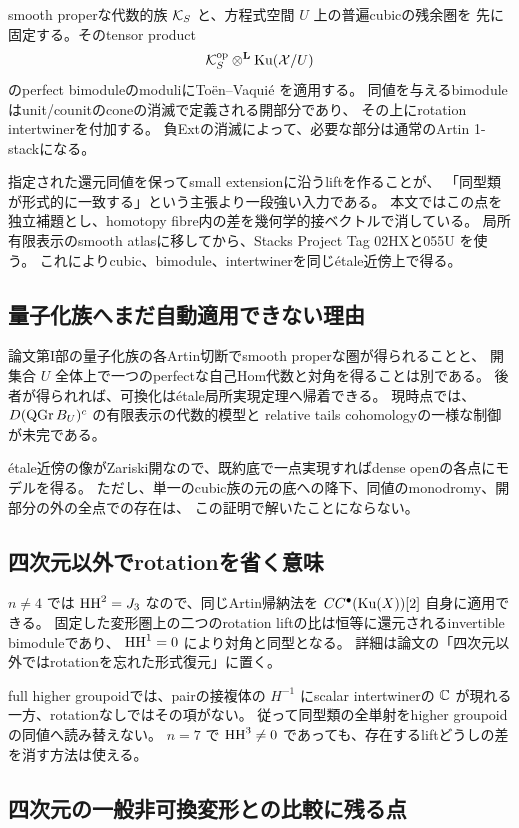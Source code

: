 smooth properな代数的族 \(\mathcal K_S\) と、方程式空間 \(U\) 上の普遍cubicの残余圏を
先に固定する。そのtensor product
\[
 \mathcal K_S^{\mathrm{op}}\mathbin{\otimes^{\mathbf L}}\operatorname{Ku}(\mathcal X/U)
\]
のperfect bimoduleのmoduliにToën--Vaquié \cite{TV} を適用する。
同値を与えるbimoduleはunit/counitのconeの消滅で定義される開部分であり、
その上にrotation intertwinerを付加する。
負Extの消滅によって、必要な部分は通常のArtin 1-stackになる。

指定された還元同値を保ってsmall extensionに沿うliftを作ることが、
「同型類が形式的に一致する」という主張より一段強い入力である。
本文ではこの点を独立補題とし、homotopy fibre内の差を幾何学的接ベクトルで消している。
局所有限表示のsmooth atlasに移してから、Stacks Project Tag 02HXと055U \cite{Stacks}を使う。
これによりcubic、bimodule、intertwinerを同じétale近傍上で得る。

\subsection{量子化族へまだ自動適用できない理由}

論文第I部の量子化族の各Artin切断でsmooth properな圏が得られることと、
開集合 \(U\) 全体上で一つのperfectな自己Hom代数と対角を得ることは別である。
後者が得られれば、可換化はétale局所実現定理へ帰着できる。
現時点では、\(D(\operatorname{QGr} B_U)^c\) の有限表示の代数的模型と
relative tails cohomologyの一様な制御が未完である。

étale近傍の像がZariski開なので、既約底で一点実現すればdense openの各点にモデルを得る。
ただし、単一のcubic族の元の底への降下、同値のmonodromy、開部分の外の全点での存在は、
この証明で解いたことにならない。

\subsection{四次元以外でrotationを省く意味}

\(n\ne4\) では \(\operatorname{HH}^2=J_3\) なので、同じArtin帰納法を
\(CC^\bullet(\operatorname{Ku}(X))[2]\) 自身に適用できる。
固定した変形圏上の二つのrotation liftの比は恒等に還元されるinvertible bimoduleであり、
\(\operatorname{HH}^1=0\) により対角と同型となる。
詳細は論文の「四次元以外ではrotationを忘れた形式復元」に置く。

full higher groupoidでは、pairの接複体の \(H^{-1}\) にscalar intertwinerの
\(\mathbb C\) が現れる一方、rotationなしではその項がない。
従って同型類の全単射をhigher groupoidの同値へ読み替えない。
\(n=7\) で \(\operatorname{HH}^3\ne0\) であっても、存在するliftどうしの差を消す方法は使える。

\subsection{四次元の一般非可換変形との比較に残る点}

